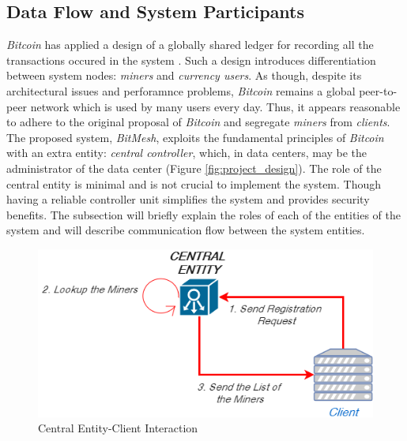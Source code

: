 \documentclass[11px]{article}
\newcommand{\projTitle}{BitMesh\xspace}
\begin{document}
\subsection{Data Flow and System Participants} \label{ssec:system_design_and_flow}
 \textit{Bitcoin} has applied a design of a globally shared ledger for recording all the transactions occured in the system \cite{bitcoin_paper}. Such a design introduces differentiation between system nodes: \textit{miners} and \textit{currency users}. As though, despite its architectural issues and perforamnce problems, \textit{Bitcoin} remains a global peer-to-peer network which is used by many users every day. Thus, it appears reasonable to adhere to the original proposal of \textit{Bitcoin} and segregate \textit{miners} from \textit{clients}. The proposed system, \textit{\projTitle}, exploits the fundamental principles of \textit{Bitcoin} with an extra entity: \textit{central controller}, which, in data centers, may be the administrator of the data center (Figure \ref{fig:project_design}). The role of the central entity is minimal and is not crucial to implement the system. Though having a reliable controller unit simplifies the system and provides security benefits. The subsection will briefly explain the roles of each of the entities of the system and will describe communication flow between the system entities.


\begin{figure}[h]
  \begin{center}
    \includegraphics[width=0.6\linewidth]{figures/central_entity_client_reg.png}
    \caption{Central Entity-Client Interaction}
    \label{fig:central_entity_client_reg}
  \end{center}
\end{figure}
\end{document}
